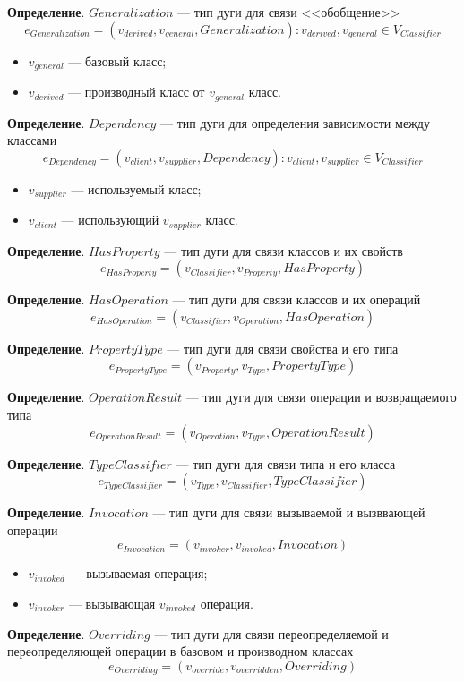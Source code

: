\textbf{Определение}. $Generalization$ --- тип дуги для связи <<обобщение>>
%
$$e_{Generalization} = (v_{derived}, v_{general}, Generalization) : v_{derived}, v_{general} \in V_{Classifier}$$

\begin{itemize}
\item $v_{general}$ --- базовый класс;
\item $v_{derived}$ --- производный класс от $v_{general}$ класс.
\end{itemize}

\textbf{Определение}. $Dependency$ --- тип дуги для определения зависимости
между классами
%
$$e_{Dependency} = (v_{client}, v_{supplier}, Dependency) : v_{client}, v_{supplier} \in V_{Classifier}$$

\begin{itemize}
\item $v_{supplier}$ --- используемый класс;
\item $v_{client}$ --- использующий $v_{supplier}$ класс.
\end{itemize}

\textbf{Определение}. $HasProperty$ --- тип дуги для связи классов и их свойств
%
$$e_{HasProperty} = (v_{Classifier}, v_{Property}, HasProperty)$$

\textbf{Определение}. $HasOperation$ --- тип дуги для связи классов и их операций
%
$$e_{HasOperation} = (v_{Classifier}, v_{Operation}, HasOperation)$$

\textbf{Определение}. $PropertyType$ --- тип дуги для связи свойства и его типа
%
$$e_{PropertyType} = (v_{Property}, v_{Type}, PropertyType)$$

\textbf{Определение}. $OperationResult$ --- тип дуги для связи операции и возвращаемого типа
%
$$e_{OperationResult} = (v_{Operation}, v_{Type}, OperationResult)$$

\textbf{Определение}. $TypeClassifier$ --- тип дуги для связи типа и его класса
%
$$e_{TypeClassifier} = (v_{Type}, v_{Classifier}, TypeClassifier)$$

\textbf{Определение}. $Invocation$ --- тип дуги для связи вызываемой и вызввающей операции
%
$$e_{Invocation} = (v_{invoker}, v_{invoked}, Invocation)$$
%
\begin{itemize}
\item $v_{invoked}$ --- вызываемая операция;
\item $v_{invoker}$ --- вызывающая $v_{invoked}$ операция.
\end{itemize}

\textbf{Определение}. $Overriding$ --- тип дуги для связи
переопределяемой и переопределяющей операции в базовом и производном классах
%
$$e_{Overriding} = (v_{override}, v_{overridden}, Overriding)$$

